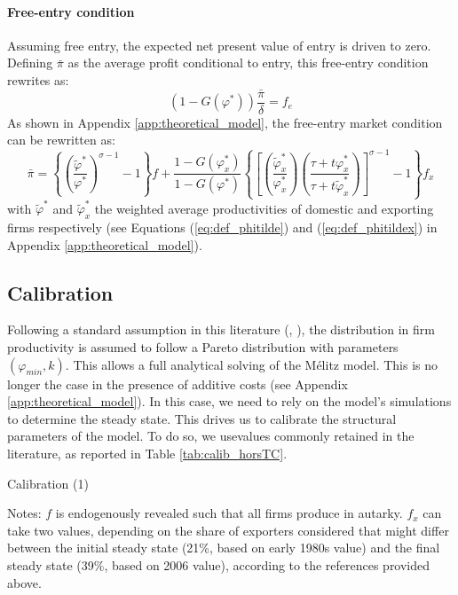 \documentclass[a4paper,11pt]{article}
\begin{document}
\paragraph{Free-entry condition} Assuming free entry, the expected net present value of entry is driven to zero.
Defining $\bar{\pi}$ as the average profit conditional to entry, this free-entry condition rewrites as:
\begin{equation}
\left(1-G(\varphi^\ast)\right)\frac{\bar{\pi}}{\delta} = f_e \label{eq:FEC}
\end{equation}
As shown in Appendix \ref{app:theoretical_model}, the free-entry market condition can be rewritten as:
\begin{equation}
\bar{\pi} = \left\{\left(\frac{\widetilde{\varphi}^\ast}{\varphi^\ast}\right)^{\sigma-1}-1 \right\}f +  \frac{1-G(\varphi_x^\ast)}{1-G(\varphi^\ast)}\left\{\left[\left(\frac{\widetilde{\varphi}_x^\ast}{\varphi_x^\ast}\right)\left(\frac{\tau+ t \varphi^\ast_x}{\tau+ t \widetilde{\varphi}^\ast_x}\right)\right]^{\sigma-1}-1 \right\}f_x \label{eq:ZCP}
\end{equation}
\noindent with $\widetilde{\varphi}^\ast$ and $\widetilde{\varphi}_x^\ast$ the weighted average productivities of domestic and exporting firms respectively (see Equations (\ref{eq:def_phitilde}) and (\ref{eq:def_phitildex}) in Appendix \ref{app:theoretical_model}).


\subsection{Calibration}

Following a standard assumption in this literature (\cite{Irrazabal_2015}, \cite{melitz-redding-Handbk-IT-2014}), the distribution in firm productivity is assumed to follow a Pareto distribution with parameters $(\varphi_{min},k)$. This allows a full analytical solving of the M\'{e}litz model. This is no longer the case in the presence of additive costs (see Appendix \ref{app:theoretical_model}). In this case, we need to rely on the model's simulations to determine the steady state. This drives us to calibrate the structural parameters of the model. To do so, we usevalues commonly retained in the literature, as reported in Table \ref{tab:calib_horsTC}.

\begin{table}[htb]
  \centering
  \caption{Calibration (1)} \label{tab:calib_horsTC}
\begin{center}
	
\end{center}
{\parbox[l]{10cm}{ \vspace{4pt}\footnotesize{Notes: $f$ is endogenously revealed such that all firms produce in autarky. $f_x$ can take two values, depending on the share of exporters considered that might differ between the initial steady state (21\%, based on early 1980s value) and the final steady state (39\%, based on 2006 value), according to the references provided above.}}}
\end{table}
\end{document}
